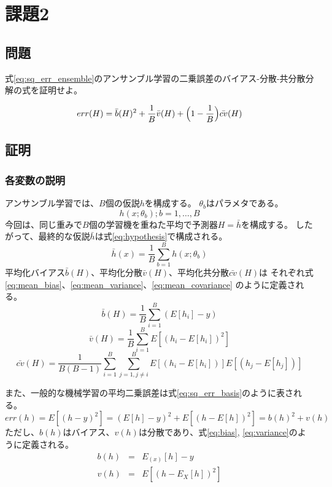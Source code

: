 \documentclass{jsarticle}
\begin{document}
\newpage

\section{課題2}
\subsection{問題}
式\ref{eq:sq_err_ensemble}のアンサンブル学習の二乗誤差のバイアス-分散-共分散分解の式を証明せよ。

\begin{equation}
    err(H) = \bar{b}(H)^2 + \frac{1}{B}\bar{v}(H) + \Bigl(1-\frac{1}{B}\Bigr) \bar{cv}(H)
    \label{eq:sq_err_ensemble}
\end{equation}

\subsection{証明}
\subsubsection{各変数の説明}
アンサンブル学習では、$B$個の仮説$h$を構成する。
$\theta_b$はパラメタである。
$$ {h(x;\theta_b);b=1, \ldots, B} $$
今回は、同じ重みで$B$個の学習機を重ねた平均で予測器$H=\bar{h}$を構成する。
したがって、最終的な仮説$\bar{h}$は式\ref{eq:hypothesis}で構成される。
\begin{equation}
    \bar{h}(x) = \frac{1}{B} \sum_{b=1}^B{h(x;\theta_b)}
    \label{eq:hypothesis}
\end{equation}
平均化バイアス$\bar{b}(H)$、平均化分散$\bar{v}(H)$、平均化共分散$\bar{cv}(H)$は
それぞれ式\ref{eq:mean_bias}、\ref{eq:mean_variance}、\ref{eq:mean_covariance}
のように定義される。
\begin{equation}
    \bar{b}(H)=\frac{1}{B}\sum_{i=1}^B{(E[h_i]-y)}
    \label{eq:mean_bias}
\end{equation}
\begin{equation}
    \bar{v}(H)=\frac{1}{B}\sum_{i=1}^B{E[(h_i-E[h_i])^2]}
    \label{eq:mean_variance}
\end{equation}
\begin{equation}
    \bar{cv}(H)=\frac{1}{B(B-1)}\sum_{i=1}^B\sum_{j=1,j\neq i}^B{E[(h_i-E[h_i])]E[(h_j-E[h_j])]}
    \label{eq:mean_covariance}
\end{equation}

また、一般的な機械学習の平均二乗誤差は式\ref{eq:sq_err_basis}のように表される。
\begin{equation}
    err(h)=E[(h-y)^2]=(E[h]-y)^2+E[(h-E[h])^2]=b(h)^2+v(h)
    \label{eq:sq_err_basis}
\end{equation}
ただし、$b(h)$はバイアス、$v(h)$は分散であり、式\ref{eq:bias}, \ref{eq:variance}のように定義される。
\begin{eqnarray}
    \label{eq:bias}
    b(h)&=&E_{(x)}[h]-y\\
    \label{eq:variance}
    v(h)&=&E[(h-E_X[h])^2]
\end{eqnarray}
\end{document}
